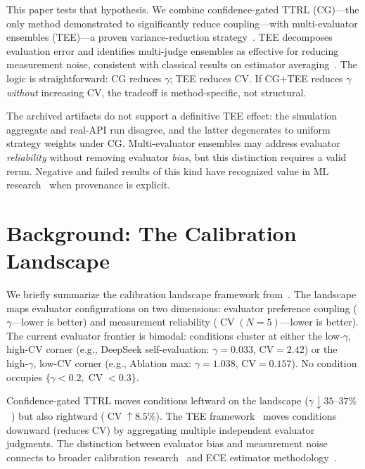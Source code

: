 \documentclass[11pt]{article}
\DeclareMathOperator{\CV}{CV}
\begin{document}
This paper tests that hypothesis. We combine confidence-gated TTRL (CG)---the only method demonstrated to significantly reduce coupling---with multi-evaluator ensembles (TEE)---a proven variance-reduction strategy~\cite{messing2026tee}. TEE decomposes evaluation error and identifies multi-judge ensembles as effective for reducing measurement noise, consistent with classical results on estimator averaging~\cite{bubeck2012regret}. The logic is straightforward: CG reduces $\gamma$; TEE reduces CV. If CG+TEE reduces $\gamma$ \textit{without} increasing CV, the tradeoff is method-specific, not structural.

The archived artifacts do not support a definitive TEE effect: the simulation aggregate and real-API run disagree, and the latter degenerates to uniform strategy weights under CG. Multi-evaluator ensembles may address evaluator \textit{reliability} without removing evaluator \textit{bias}, but this distinction requires a valid rerun. Negative and failed results of this kind have recognized value in ML research~\cite{dodge2019reproducibility} when provenance is explicit.

\section{Background: The Calibration Landscape}

We briefly summarize the calibration landscape framework from~\cite{liu2026caleffects}. The landscape maps evaluator configurations on two dimensions: evaluator preference coupling ($\gamma$---lower is better) and measurement reliability ($\CV(N{=}5)$---lower is better). The current evaluator frontier is bimodal: conditions cluster at either the low-$\gamma$, high-CV corner (e.g., DeepSeek self-evaluation: $\gamma{=}0.033$, CV${=}2.42$) or the high-$\gamma$, low-CV corner (e.g., Ablation max: $\gamma{=}1.038$, CV${=}0.157$). No condition occupies $\{\gamma < 0.2, \CV < 0.3\}$.

Confidence-gated TTRL moves conditions leftward on the landscape ($\gamma \downarrow 35$--$37\%$~\cite{liu2026caleffects}) but also rightward ($\CV \uparrow 8.5\%$). The TEE framework~\cite{messing2026tee} moves conditions downward (reduces CV) by aggregating multiple independent evaluator judgments. The distinction between evaluator bias and measurement noise connects to broader calibration research~\cite{guo2017calibration,niculescu2005predicting} and ECE estimator methodology~\cite{nixon2019measuring,roelofs2022mitigating}.
\end{document}
